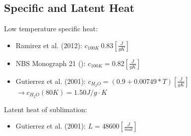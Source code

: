 \documentclass[11pt]{article} %
\begin{document}
\subsection{Specific  and Latent Heat}
\label{sec:sheat}

	Low temperature specific heat:
	
	\begin{itemize}
	\item Ramirez et al. (2012): $c_{100 K} ~ 0.83 [\frac{J}{g K}]$
	\item NBS Monograph 21 (): $c_{100 K} = 0.82 [\frac{J}{g K}]$
	\item Gutierrez et al. (2001): $c_{H_{2}O} = (0.9 + 0.00749 * T) [\frac{J}{g K}]$
		$\rightarrow c_{H_{2}O}(80K) = 1.50 J/g\cdot K$
	\end{itemize}
	
	Latent heat of sublimation:
	
	\begin{itemize}
	\item Gutierrez et al. (2001): $L = 48600 [\frac{J}{mol}]$
	\end{itemize}
	
\end{document}
